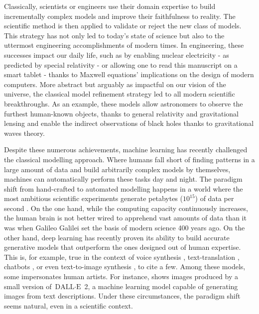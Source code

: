Classically, scientists or engineers use their domain expertise to build incrementally complex models and improve their faithfulness to reality. The scientific method is then applied to validate or reject the new class of models. This strategy has not only led to today's state of science but also to the uttermost engineering accomplishments of modern times. In engineering, these successes impact our daily life, such as by enabling nuclear electricity - as predicted by special relativity - or allowing one to read this manuscript on a smart tablet - thanks to Maxwell equations' implications on the design of modern computers. More abstract but arguably as impactful on our vision of the universe, the classical model refinement strategy led to all modern scientific breakthroughs. As an example, these models allow astronomers to observe the furthest human-known objects, thanks to general relativity and gravitational lensing and enable the indirect observations of black holes thanks to gravitational waves theory.

Despite these numerous achievements, machine learning has recently challenged the classical modelling approach. Where humans fall short of finding patterns in a large amount of data and build arbitrarily complex models by themselves, machines can automatically perform these tasks day and night. The paradigm shift from hand-crafted to automated modelling happens in a world where the most ambitious scientific experiments generate petabytes ($10^{15}$) of data per second \citep{noauthor_cern_nodate}. On the one hand, while the computing capacity continuously increases, the human brain is not better wired to apprehend vast amounts of data than it was when Galileo Galilei set the basis of modern science 400 years ago. On the other hand, deep learning has recently proven its ability to build accurate generative models that outperform the ones designed out of human expertise. This is, for example, true in the context of voice synthesis \citep{van_den_oord_wavenet_2016}, text-translation \citep{brown2020language, devlin2018bert}, chatbots \citep{alayrac2022flamingo}, or even text-to-image synthesis \citep{ramesh2022hierarchical, saharia2022photorealistic}, to cite a few. Among these models, some impersonates human artists. For instance,  shows images produced by a small version of $\text{DALL}\cdot\text{E}$ 2, a machine learning model capable of generating images from text descriptions. Under these circumstances, the paradigm shift seems natural, even in a scientific context.


